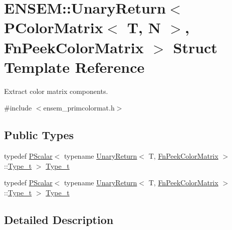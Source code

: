 \hypertarget{structENSEM_1_1UnaryReturn_3_01PColorMatrix_3_01T_00_01N_01_4_00_01FnPeekColorMatrix_01_4}{}\section{E\+N\+S\+EM\+:\+:Unary\+Return$<$ P\+Color\+Matrix$<$ T, N $>$, Fn\+Peek\+Color\+Matrix $>$ Struct Template Reference}
\label{structENSEM_1_1UnaryReturn_3_01PColorMatrix_3_01T_00_01N_01_4_00_01FnPeekColorMatrix_01_4}


Extract color matrix components.  




{\ttfamily \#include $<$ensem\+\_\+primcolormat.\+h$>$}

\subsection*{Public Types}
\begin{DoxyCompactItemize}
\item 
typedef \mbox{\hyperlink{classENSEM_1_1PScalar}{P\+Scalar}}$<$ typename \mbox{\hyperlink{structENSEM_1_1UnaryReturn}{Unary\+Return}}$<$ T, \mbox{\hyperlink{structENSEM_1_1FnPeekColorMatrix}{Fn\+Peek\+Color\+Matrix}} $>$\+::\mbox{\hyperlink{structENSEM_1_1UnaryReturn_3_01PColorMatrix_3_01T_00_01N_01_4_00_01FnPeekColorMatrix_01_4_ab57f89c629e14031c8ea8f4215b52543}{Type\+\_\+t}} $>$ \mbox{\hyperlink{structENSEM_1_1UnaryReturn_3_01PColorMatrix_3_01T_00_01N_01_4_00_01FnPeekColorMatrix_01_4_ab57f89c629e14031c8ea8f4215b52543}{Type\+\_\+t}}
\item 
typedef \mbox{\hyperlink{classENSEM_1_1PScalar}{P\+Scalar}}$<$ typename \mbox{\hyperlink{structENSEM_1_1UnaryReturn}{Unary\+Return}}$<$ T, \mbox{\hyperlink{structENSEM_1_1FnPeekColorMatrix}{Fn\+Peek\+Color\+Matrix}} $>$\+::\mbox{\hyperlink{structENSEM_1_1UnaryReturn_3_01PColorMatrix_3_01T_00_01N_01_4_00_01FnPeekColorMatrix_01_4_ab57f89c629e14031c8ea8f4215b52543}{Type\+\_\+t}} $>$ \mbox{\hyperlink{structENSEM_1_1UnaryReturn_3_01PColorMatrix_3_01T_00_01N_01_4_00_01FnPeekColorMatrix_01_4_ab57f89c629e14031c8ea8f4215b52543}{Type\+\_\+t}}
\end{DoxyCompactItemize}


\subsection{Detailed Description}
